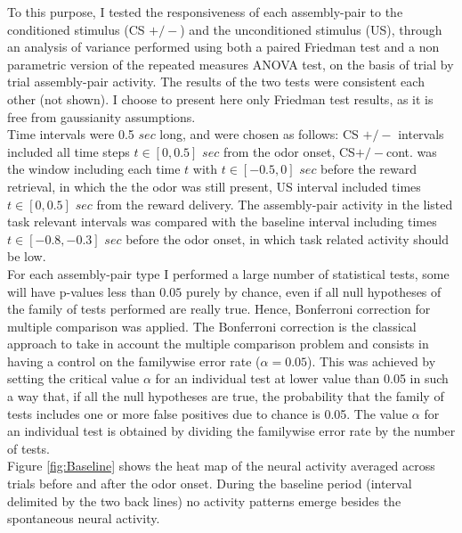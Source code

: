 To this purpose, I tested the responsiveness of each assembly-pair to the conditioned stimulus (CS $+/-$) and the unconditioned stimulus (US), through an analysis of variance performed using both a paired Friedman test and a non parametric version of the repeated measures ANOVA test, on the basis of trial by trial assembly-pair activity. The results of the two tests were consistent each other (not shown). I choose to present here only Friedman test results, as it is free from gaussianity assumptions.\\Time intervals were 0.5 $sec$ long, and were chosen as follows: CS $+/-$ intervals included all time steps $t \in [0, 0.5]$ $sec$ from the odor onset, CS$+/-$cont. was the window including each time $t$ with $t \in [-0.5, 0]$ $sec$ before the reward retrieval, in which the the odor was still present, US interval included times $t \in [0,0.5]$ $sec$ from the reward delivery. The assembly-pair activity in the listed task relevant intervals was compared with the baseline interval including times $t \in [-0.8, -0.3]$ $sec$ before the odor onset, in which task related activity should be low.\\For each assembly-pair type I performed a large number of statistical tests, some will have p-values less than $0.05$ purely by chance, even if all null hypotheses of the family of tests performed are really true. Hence, Bonferroni correction for multiple comparison was applied. The Bonferroni correction is the classical approach to take in account the multiple comparison problem and consists in having a control on the familywise error rate ($\alpha=0.05$). This was achieved by setting the critical value $\alpha$ for an individual test at lower value than 0.05 in such a way that, if all the null hypotheses are true, the probability that the family of tests includes one or more false positives due to chance is 0.05. The value $\alpha$ for an individual test is obtained by dividing the familywise error rate by the number of tests.\\Figure \ref{fig:Baseline} shows the heat map of the neural activity averaged across trials before and after the odor onset. During the baseline period (interval delimited by the two back lines) no activity patterns emerge besides the spontaneous neural activity.\\
